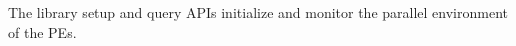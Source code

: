 The library setup and query \openshmem \ac{API}s initialize and monitor the parallel environment of the \ac{PE}s.